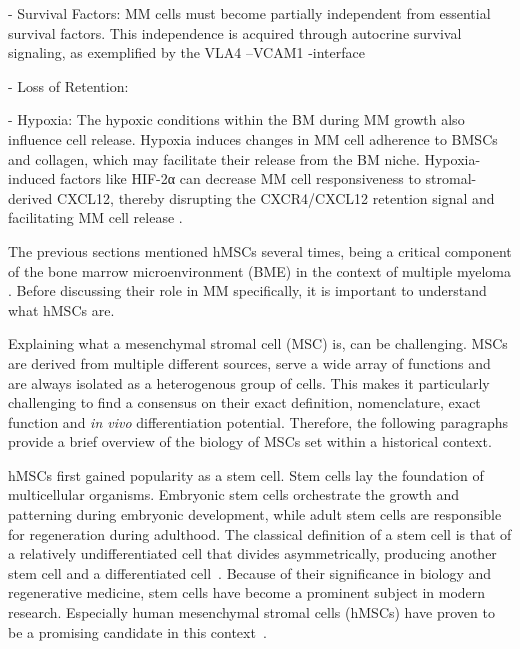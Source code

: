 - Survival Factors:
MM cells must become partially independent from
essential survival factors. This independence is acquired through autocrine
survival signaling, as exemplified by the VLA4 –VCAM1 -interface



- Loss of Retention:




- Hypoxia:
The hypoxic conditions within the BM during MM growth also influence cell
release. Hypoxia induces changes in MM cell adherence to BMSCs and collagen,
which may facilitate their release from the BM niche. Hypoxia-induced factors
like HIF-2α can decrease MM cell responsiveness to stromal-derived CXCL12,
thereby disrupting the CXCR4/CXCL12 retention signal and facilitating MM cell
release \cite{zeissigTumourDisseminationMultiple2020}.







%
\label{sec:intro_hMSCs}%
The previous sections mentioned hMSCs several times, being a critical component
of the bone marrow microenvironment (BME) in the context of multiple myeloma
\cite{mangoliniBoneMarrowStromal2020}. Before discussing their role in MM
specifically, it is important to understand what hMSCs are.

Explaining what a mesenchymal stromal cell (MSC) is, can be challenging. MSCs
are derived from multiple different sources, serve a wide array of functions and
are always isolated as a heterogenous group of cells. This makes it particularly
challenging to find a consensus on their exact definition, nomenclature, exact
function and \textit{in vivo} differentiation potential. Therefore, the
following paragraphs provide a brief overview of the biology of MSCs set within
a historical context.

hMSCs first gained popularity as a stem cell. Stem cells lay the foundation of
multicellular organisms. Embryonic stem cells orchestrate the growth and
patterning during embryonic development, while adult stem cells are responsible
for regeneration during adulthood. The classical definition of a stem cell is
that of a relatively undifferentiated cell that divides asymmetrically,
producing another stem cell and a differentiated
cell~\cite{cooperCellMolecularApproach2000, shenghuiMechanismsStemCell2009}.
Because of their significance in biology and regenerative medicine, stem cells
have become a prominent subject in modern research. Especially human mesenchymal
stromal cells (hMSCs) have proven to be a promising candidate in this
context~\cite{ullahHumanMesenchymalStem2015}.

